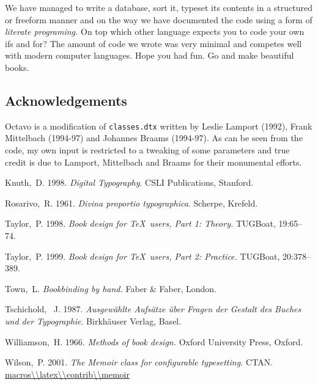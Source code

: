 \documentclass[imperial, justified]{octavo}
\begin{document}
We have managed to write a database, sort it, typeset its contents in a structured or freeform manner
and on the way we have documented the code using a form of \textit{literate programing.} On top which
other language expects you to code your own ifs and for? 
The amount of code we wrote was very minimal and competes well with modern computer languages. 
Hope you had fun. Go and make beautiful books. \citet{knuth98}


%


 \subsection{Acknowledgements}

 Octavo is a modification of \texttt{classes.dtx} written by Leslie Lamport (1992),
 Frank Mittelbach (1994-97) and Johannes Braams (1994-97). As can be seen
 from the code, my own input is restricted to a tweaking of some parameters
 and true credit is due to Lamport, Mittelbach and Braams for their
 monumental efforts.

 \begin{thebibliography}{16}

  Knuth,~D. 1998. \emph{Digital Typography}. CSLI 
 Publications, Stanford.

  Rosarivo,~R. 1961. \emph{Divina proportio typographica}. 
 Scherpe, Krefeld.

  Taylor,~P. 1998. \emph{Book design for \TeX\ users, Part 1: 
 Theory.} TUGBoat, 19:65--74.

  Taylor,~P. 1999. \emph{Book design for \TeX\ users, Part 2:
 Practice.} TUGBoat, 20:378--389.

  Town,~L. \emph{Bookbinding by hand.} Faber \& Faber, London.

  Tschichold,~ J. 1987. \emph{Ausgew\"{a}hlte Aufs\"{a}tze
 \"{u}ber Fragen der Gestalt des Buches und der Typographie}. Birkh\"{a}user
 Verlag, Basel.

  Williamson,~H. 1966. \emph{Methods of book design.} Oxford 
 University Press, Oxford.

  Wilson,~P. 2001. \emph{The Memoir class for configurable
 typesetting.} CTAN. \url{macros\\latex\\contrib\\memoir} 

 \end{thebibliography}
\end{document}
